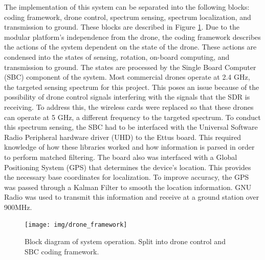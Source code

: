 The implementation of this system can be separated into the following blocks: coding framework, drone control, spectrum sensing, spectrum localization, and transmission to ground. These blocks are described in Figure \ref{fig:sys_diagram}. Due to the modular platform's independence from the drone, the coding framework describes the actions of the system dependent on the state of the drone. These actions are condensed into the states of sensing, rotation, on-board computing, and transmission to ground. The states are processed by the Single Board Computer (SBC) component of the system. Most commercial drones operate at 2.4 GHz, the targeted sensing spectrum for this project. This poses an issue because of the possibility of drone control signals interfering with the signals that the SDR is receiving. To address this, the wireless cards were replaced so that these drones can operate at 5 GHz, a different frequency to the targeted spectrum. To conduct this spectrum sensing, the SBC had to be interfaced with the Universal Software Radio Peripheral hardware driver (UHD) to the Ettus board. This required knowledge of how these libraries worked and how information is parsed in order to perform matched filtering. The board also was interfaced with a Global Positioning System (GPS) that determines the device's location. This provides the necessary base coordinates for localization. To improve accuracy, the GPS was passed through a Kalman Filter to smooth the location information. GNU Radio was used to transmit this information and receive at a ground station over 900MHz. \par 
\begin{figure}[ht!]
    \centering
    \texttt{[image: img/drone\_framework]}
    \caption{Block diagram of system operation. Split into drone control and SBC coding framework.}
    \label{fig:sys_diagram}
\end{figure}


